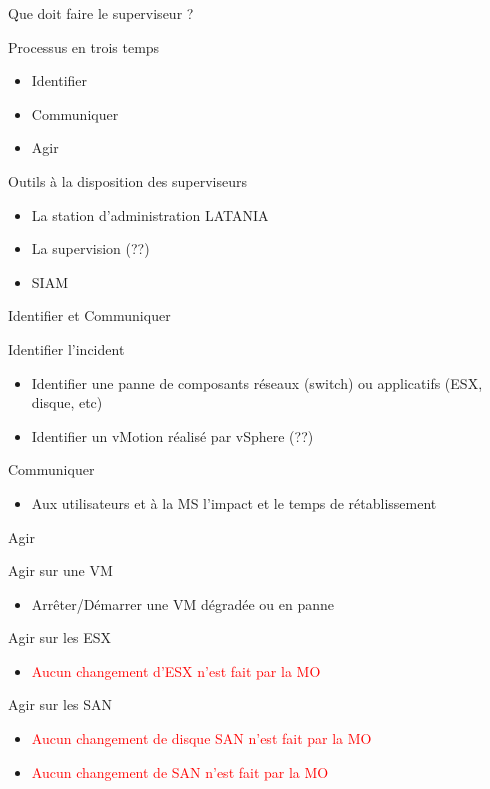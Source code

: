 \documentclass[10pt]{beamer}
\begin{document}
\begin{frame}{Que doit faire le superviseur ?}
\begin{block}{Processus en trois temps}
\begin{itemize}
\item Identifier
\item Communiquer
\item Agir
\end{itemize}
\end{block}
\begin{block}{Outils à la disposition des superviseurs}
\begin{itemize}
\item La station d'administration LATANIA
\item La supervision (??)
\item SIAM 
\end{itemize}
\end{block}
\end{frame}

\begin{frame}{Identifier et Communiquer}
\begin{block}{Identifier l'incident}
\begin{itemize}
\item Identifier une panne de composants réseaux (switch) ou applicatifs (ESX, disque, etc)
\item Identifier un vMotion réalisé par vSphere (??)
\end{itemize}
\end{block}
\begin{block}{Communiquer}
\begin{itemize}
\item Aux utilisateurs et à la MS l'impact et le temps de rétablissement
\end{itemize}
\end{block}
\end{frame}

\begin{frame}{Agir}
\begin{block}{Agir sur une VM}
\begin{itemize}
\item Arrêter/Démarrer une VM dégradée ou en panne
\end{itemize}
\end{block}
\begin{block}{Agir sur les ESX}
\begin{itemize}
\item \textcolor{red}{Aucun changement d'ESX n'est fait par la MO}
\end{itemize}
\end{block}
\begin{block}{Agir sur les SAN}
\begin{itemize}
\item \textcolor{red}{Aucun changement de disque SAN n'est fait par la MO}
\item \textcolor{red}{Aucun changement de SAN n'est fait par la MO}
\end{itemize}
\end{block}
\end{frame}
\end{document}
